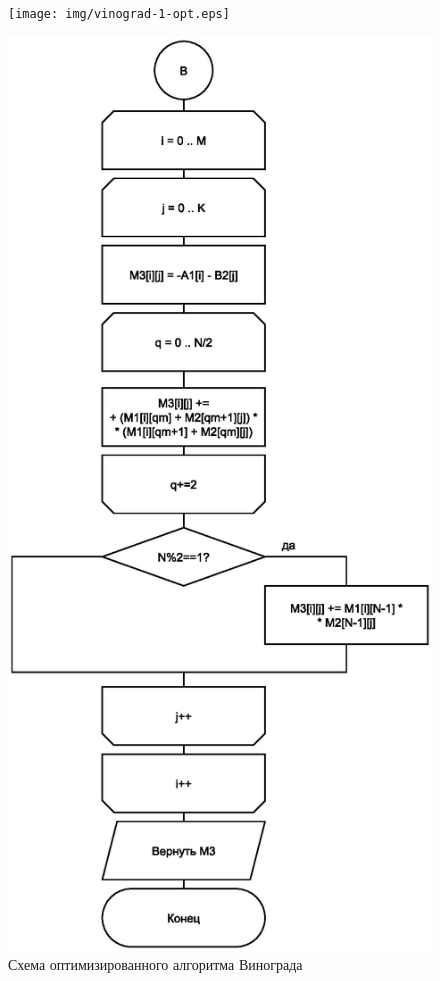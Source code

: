 \begin{figure}[h]
	\centering
	\texttt{[image: img/vinograd-1-opt.eps]}
	\label{fig:vinograd_opt-1}
\end{figure}
\begin{figure}[h]
	\centering
	\includegraphics[scale=0.75]{img/vinograd-2-opt.eps}
	\caption{Схема оптимизированного алгоритма Винограда}
	\label{fig:vinograd_opt}
\end{figure}

